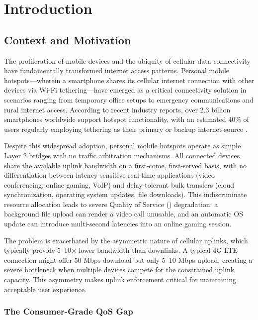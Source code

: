 \chapter{Introduction}
\label{ch:introduction}

\section{Context and Motivation}
\label{sec:context}

The proliferation of mobile devices and the ubiquity of cellular data connectivity have fundamentally transformed internet access patterns. Personal mobile hotspots—wherein a smartphone shares its cellular internet connection with other devices via Wi-Fi tethering—have emerged as a critical connectivity solution in scenarios ranging from temporary office setups to emergency communications and rural internet access. According to recent industry reports, over 2.3 billion smartphones worldwide support hotspot functionality, with an estimated 40\% of users regularly employing tethering as their primary or backup internet source \cite{cisco2023}.

Despite this widespread adoption, personal mobile hotspots operate as simple Layer 2 bridges with no traffic arbitration mechanisms. All connected devices share the available uplink bandwidth on a first-come, first-served basis, with no differentiation between latency-sensitive real-time applications (video conferencing, online gaming, VoIP) and delay-tolerant bulk transfers (cloud synchronization, operating system updates, file downloads). This indiscriminate resource allocation leads to severe Quality of Service (\qos) degradation: a background file upload can render a video call unusable, and an automatic OS update can introduce multi-second latencies into an online gaming session.

The problem is exacerbated by the asymmetric nature of cellular uplinks, which typically provide 5–10× lower bandwidth than downlinks. A typical 4G LTE connection might offer 50 Mbps download but only 5–10 Mbps upload, creating a severe bottleneck when multiple devices compete for the constrained uplink capacity. This asymmetry makes uplink \qos enforcement critical for maintaining acceptable user experience.

\subsection{The Consumer-Grade QoS Gap}

